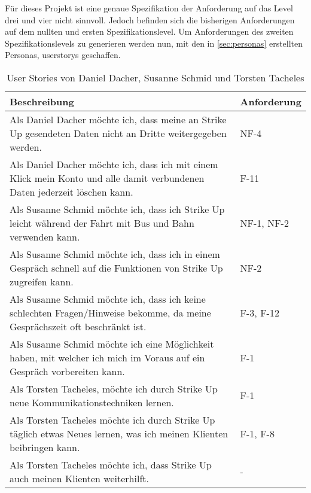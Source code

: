 Für dieses Projekt ist eine genaue Spezifikation der Anforderung auf das Level drei und vier nicht sinnvoll. Jedoch befinden sich die bisherigen Anforderungen auf dem nullten und ersten Spezifikationslevel. Um Anforderungen des zweiten Spezifikationslevels zu generieren werden nun, mit den in \ref{sec:personas} erstellten Personas, \glspl{userstory} geschaffen.

\pagebreak
\begin{table}[H]
    {
        \begin{tabularx}{\linewidth}{|X|C{2,5cm}|}
            \hline
            Beschreibung & Anforderung \\
            \hline
            Als Daniel Dacher möchte ich, dass meine an Strike Up gesendeten Daten nicht an Dritte weitergegeben werden.
                         & NF-4
            \\
            Als Daniel Dacher möchte ich, dass ich mit einem Klick mein Konto und alle damit verbundenen Daten jederzeit löschen kann.
                         & F-11
            \\
            Als Susanne Schmid möchte ich, dass ich Strike Up leicht während der Fahrt mit Bus und Bahn verwenden kann.
                         & NF-1, NF-2
            \\
            Als Susanne Schmid möchte ich, dass ich in einem Gespräch schnell auf die Funktionen von Strike Up zugreifen kann.
                         & NF-2
            \\
            Als Susanne Schmid möchte ich, dass ich keine schlechten Fragen/Hinweise bekomme, da meine Gesprächszeit oft beschränkt ist.
                         & F-3, F-12
            \\
            Als Susanne Schmid möchte ich eine Möglichkeit haben, mit welcher ich mich im Voraus auf ein Gespräch vorbereiten kann.
                         & F-1
            \\
            Als Torsten Tacheles, möchte ich durch Strike Up neue Kommunikationstechniken lernen.
                         & F-1
            \\
            Als Torsten Tacheles möchte ich durch Strike Up täglich etwas Neues lernen, was ich meinen Klienten beibringen kann.
                         & F-1, F-8
            \\
            Als Torsten Tacheles möchte ich, dass Strike Up auch meinen Klienten weiterhilft.
                         & -
            \\
            \hline
        \end{tabularx}
    }
    \caption{User Stories von Daniel Dacher, Susanne Schmid und Torsten Tacheles}
    \label{tab:userstories}
\end{table}

